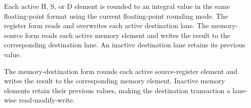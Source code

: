 Each active H, S, or D element is rounded to an integral value in the same
floating-point format using the current floating-point rounding mode. The
register form reads and overwrites each active destination lane. The
memory-source form reads each active memory element and writes the result to the
corresponding destination lane. An inactive destination lane retains its
previous value.

The memory-destination form rounds each active source-register element and
writes the result to the corresponding memory element. Inactive memory elements
retain their previous values, making the destination transaction a lane-wise
read-modify-write.
